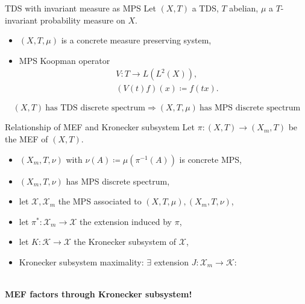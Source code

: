 \begin{frame}{TDS with invariant measure as MPS}
Let $(X,T)$ a TDS, $T$ abelian, $\mu$ a $T$-invariant probability measure on $X$.
\begin{itemize}
  \item $(X,T,\mu)$ is a concrete measure preserving system,
      \item \pause MPS Koopman operator
\begin{equation*}
  \begin{split}
    &V : T \to L(L^2(X)),\\
    & (V(t) f)(x) \coloneq f (t x).
  \end{split}
\end{equation*}
\end{itemize}
\pause
\begin{proposition}
  \begin{equation*}
    (X,T) \ \text{has TDS discrete spectrum} \Rightarrow (X,T,\mu) \ \text{has MPS discrete spectrum}
  \end{equation*}
  \end{proposition}
\end{frame}
\begin{frame}[fragile]{Relationship of MEF and Kronecker subsystem}
  Let $\pi : (X,T) \to (X_m,T)$ be the MEF of $(X,T)$.
  \begin{itemize}
    \item $(X_m,T, \nu)$ with $\nu(A)\coloneq  \mu(\pi^{-1}(A))$ is concrete MPS,
    \item $(X_m,T, \nu)$ has MPS discrete spectrum,
    \item \pause let $\mathcal{X}, \mathcal{X}_m$ the MPS associated to $(X,T,\mu), (X_m,T,\nu)$,
  \item let $\pi^* : \mathcal{X}_m \to \mathcal{X}$ the extension induced by $\pi$,
  \item \pause let $K: \mathcal{K} \to \mathcal{X}$ the Kronecker subsystem of $\mathcal{X}$,
  \item Kronecker subsystem maximality: $\exists$ extension $J: \mathcal{X}_m \to \mathcal{K}$:
\end{itemize}
  \begin{center}
    \\
\pause
  \textbf{MEF factors through Kronecker subsystem!}
  \end{center}
  \end{frame}
